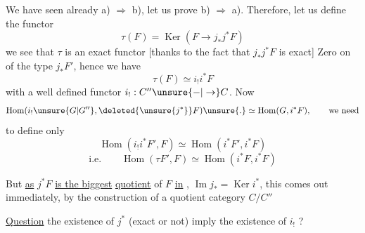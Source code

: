 









We have seen already a) $\Rightarrow$ b), let us prove b) $\Rightarrow$ a). Therefore, let us define the functor
\[
\tau(F)=\operatorname{Ker}(F\to j_*j^*F)
\]
we see that $\tau$ is an  exact functor [thanks to the fact that $j_*j^*F$ is exact] Zero on  of the type $j_*F'$,  hence we have
\[
\tau(F)\simeq i_!i^*F
\]
with a well defined  functor $i_!:C''\unsure{-|\to}C$. Now 
\[
\operatorname{Hom}(i_!\unsure{G|G''},\deleted{\unsure{j^*}}F)\unsure{.}\simeq\operatorname{Hom}(G,i^*F),\qquad\text{we need}
\]
to define only
\[
\operatorname{Hom}(i_!i^*F',F)\simeq\operatorname{Hom}(i^*F',i^*F)
\]
\[
\text{i.e.}\qquad\operatorname{Hom}(\tau F',F)\simeq\operatorname{Hom}(i^*F,i^*F)
\]

But \uline{as} $j^*F$ \uline{is the biggest}  \uline{quotient} of $F$ \uline{in} , $\operatorname{Im}j_*=\operatorname{Ker}i^*$, this comes out immediately, by the construction of a quotient category $C/C''$


\uline{Question}  the existence of $j^*$ (exact or not)   imply the existence of $i_!$ ?

